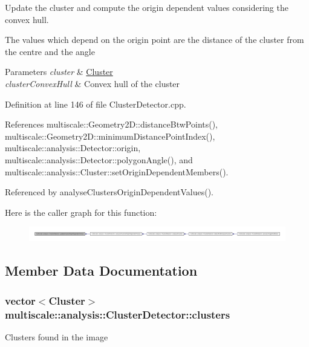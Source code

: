 \-Update the cluster and compute the origin dependent values considering the convex hull. 

\-The values which depend on the origin point are the distance of the cluster from the centre and the angle


\begin{DoxyParams}{\-Parameters}
{\em cluster} & \hyperlink{classmultiscale_1_1analysis_1_1Cluster}{\-Cluster} \\
\hline
{\em cluster\-Convex\-Hull} & \-Convex hull of the cluster \\
\hline
\end{DoxyParams}


\-Definition at line 146 of file \-Cluster\-Detector.\-cpp.



\-References multiscale\-::\-Geometry2\-D\-::distance\-Btw\-Points(), multiscale\-::\-Geometry2\-D\-::minimum\-Distance\-Point\-Index(), multiscale\-::analysis\-::\-Detector\-::origin, multiscale\-::analysis\-::\-Detector\-::polygon\-Angle(), and multiscale\-::analysis\-::\-Cluster\-::set\-Origin\-Dependent\-Members().



\-Referenced by analyse\-Clusters\-Origin\-Dependent\-Values().



\-Here is the caller graph for this function\-:\nopagebreak
\begin{figure}[H]
\begin{center}
\leavevmode
\includegraphics[width=350pt]{classmultiscale_1_1analysis_1_1ClusterDetector_ac7e008a7674205095f94b91c8d7cdccc_icgraph}
\end{center}
\end{figure}




\subsection{\-Member \-Data \-Documentation}
\hypertarget{classmultiscale_1_1analysis_1_1ClusterDetector_aa81a8649bc743389c2fc1919d47eb5b3}{
\subsubsection[{clusters}]{\setlength{\rightskip}{0pt plus 5cm}vector$<${\bf \-Cluster}$>$ {\bf multiscale\-::analysis\-::\-Cluster\-Detector\-::clusters}}}\label{classmultiscale_1_1analysis_1_1ClusterDetector_aa81a8649bc743389c2fc1919d47eb5b3}
\-Clusters found in the image 


